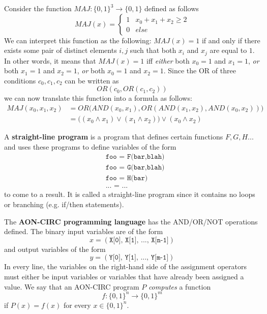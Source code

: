 \documentclass{article}
\begin{document}
  \begin{example}
  Consider the function $MAJ: \{0,1\}^3 \longrightarrow \{0,1\}$ defined as follows
  \[MAJ (x) = \begin{cases}
  1 & x_0 + x_1 + x_2 \geq 2 \\
  0 & else
  \end{cases}\]
  We can interpret this function as the following: $MAJ(x) = 1$ if and only if there exists some pair of distinct elements $i, j$ such that both $x_i$ and $x_j$ are equal to $1$. In other words, it means that $MAJ(x) = 1$ iff \textit{either} both $x_0 = 1$ and $x_1 = 1$, \textit{or} both $x_1 = 1$ and $x_2 = 1$, \textit{or} both $x_0 = 1$ and $x_2 = 1$. Since the OR of three conditions $c_0, c_1, c_2$ can be written as
  \[OR(c_0, OR(c_1, c_2))\]
  we can now translate this function into a formula as follows: 
  \begin{align*}
      MAJ(x_0, x_1, x_2) & = OR\big( AND (x_0, x_1), OR(AND(x_1, x_2), AND(x_0, x_2)) \big) \\
      & = \big((x_0 \wedge x_1) \vee (x_1 \wedge x_2)\big) \vee (x_0 \wedge x_2)
  \end{align*}
  \end{example}

  \begin{definition}
  A \textbf{straight-line program} is a program that defines certain functions $F, G, H...$ and uses these programs to define variables of the form 
  \begin{align*}
      &\texttt{foo = F(bar,blah)} \\
      &\texttt{foo = G(bar,blah)} \\
      &\texttt{foo = H(bar)} \\
      &\texttt{... = ...}
  \end{align*}
  to come to a result. It is called a straight-line program since it contains no loops or branching (e.g. if/then statements). 

  The \textbf{AON-CIRC programming language} has the AND/OR/NOT operations defined. The binary input variables are of the form 
  \[x = (\texttt{X[0], X[1], ..., X[n-1]})\]
  and output variables of the form 
  \[y = (\texttt{Y[0], Y[1], ..., Y[m-1]})\]
  In every line, the variables on the right-hand side of the assignment operators must either be input variables or variables that have already been assigned a value. We say that an AON-CIRC program $P$ \textit{computes} a function 
  \[f: \{0,1\}^n \longrightarrow \{0,1\}^m\]
  if $P(x) = f(x)$ for every $x \in \{0,1\}^n$.
  \end{definition}
\end{document}
